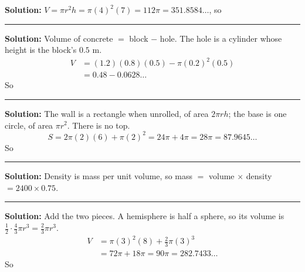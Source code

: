 \documentclass[12pt]{article}
\begin{document}




\textbf{Solution:} $V = \pi r^2 h = \pi (4)^2 (7) = 112\pi = 351.8584\ldots$, so 

\vspace{0.2cm}\noindent\rule{\linewidth}{0.2pt}


\textbf{Solution:} Volume of concrete $=$ block $-$ hole. The hole is a cylinder whose height is the block's $0.5$ m.
\begin{align*}
  V &= (1.2)(0.8)(0.5) - \pi (0.2)^2 (0.5) \\
    &= 0.48 - 0.0628\ldots
\end{align*}
So 

\vspace{0.2cm}\noindent\rule{\linewidth}{0.2pt}


\textbf{Solution:} The wall is a rectangle when unrolled, of area $2\pi r h$; the base is one circle, of area $\pi r^2$. There is no top.
\[ S = 2\pi(2)(6) + \pi(2)^2 = 24\pi + 4\pi = 28\pi = 87.9645\ldots \]
So 

\vspace{0.2cm}\noindent\rule{\linewidth}{0.2pt}


\textbf{Solution:} Density is mass per unit volume, so mass $=$ volume $\times$ density $= 2400 \times 0.75$. 

\vspace{0.2cm}\noindent\rule{\linewidth}{0.2pt}


\textbf{Solution:} Add the two pieces. A hemisphere is half a sphere, so its volume is $\frac{1}{2}\cdot\frac{4}{3}\pi r^3 = \frac{2}{3}\pi r^3$.
\begin{align*}
  V &= \pi (3)^2 (8) + \tfrac{2}{3}\pi (3)^3 \\
    &= 72\pi + 18\pi = 90\pi = 282.7433\ldots
\end{align*}
So 
\end{document}
